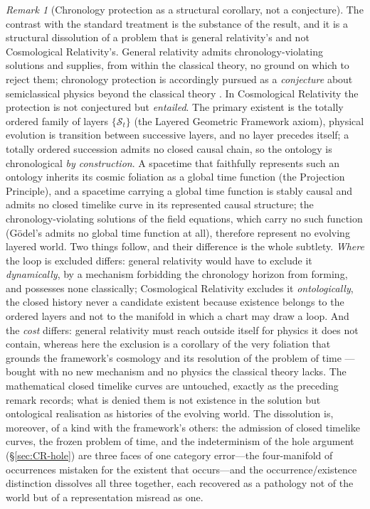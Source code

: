 \documentclass[11pt,a4paper]{article}
\theoremstyle{plain}
\theoremstyle{definition}
\theoremstyle{remark}
\newtheorem{remark}{Remark}
\begin{document}
\begin{remark}[Chronology protection as a structural corollary, not a conjecture]
The contrast with the standard treatment is the substance of the result, and it is a structural dissolution of a problem that is general relativity's and not Cosmological Relativity's. General relativity admits chronology-violating solutions and supplies, from within the classical theory, no ground on which to reject them; chronology protection is accordingly pursued as a \emph{conjecture} about semiclassical physics beyond the classical theory \cite{Hawking1992}. In Cosmological Relativity the protection is not conjectured but \emph{entailed}. The primary existent is the totally ordered family of layers $\{\mathcal{S}_t\}$ (the Layered Geometric Framework axiom), physical evolution is transition between successive layers, and no layer precedes itself; a totally ordered succession admits no closed causal chain, so the ontology is chronological \emph{by construction}. A spacetime that faithfully represents such an ontology inherits its cosmic foliation as a global time function (the Projection Principle), and a spacetime carrying a global time function is stably causal and admits no closed timelike curve in its represented causal structure; the chronology-violating solutions of the field equations, which carry no such function (G\"odel's admits no global time function at all), therefore represent no evolving layered world. Two things follow, and their difference is the whole subtlety. \emph{Where} the loop is excluded differs: general relativity would have to exclude it \emph{dynamically}, by a mechanism forbidding the chronology horizon from forming, and possesses none classically; Cosmological Relativity excludes it \emph{ontologically}, the closed history never a candidate existent because existence belongs to the ordered layers and not to the manifold in which a chart may draw a loop. And the \emph{cost} differs: general relativity must reach outside itself for physics it does not contain, whereas here the exclusion is a corollary of the very foliation that grounds the framework's cosmology and its resolution of the problem of time \cite{JanzenModernParallax}---bought with no new mechanism and no physics the classical theory lacks. The mathematical closed timelike curves are untouched, exactly as the preceding remark records; what is denied them is not existence in the solution but ontological realisation as histories of the evolving world. The dissolution is, moreover, of a kind with the framework's others: the admission of closed timelike curves, the frozen problem of time, and the indeterminism of the hole argument (\S\ref{sec:CR-hole}) are three faces of one category error---the four-manifold of occurrences mistaken for the existent that occurs---and the occurrence/existence distinction dissolves all three together, each recovered as a pathology not of the world but of a representation misread as one.
\end{remark}
\end{document}
